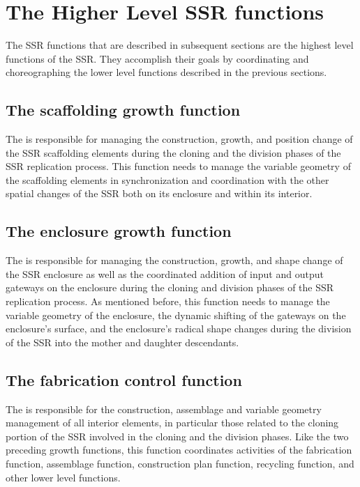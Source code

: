\section{The Higher Level SSR functions}

The SSR functions that are
described in subsequent sections are the highest level functions of the
SSR. They accomplish their goals by coordinating and choreographing the
lower level functions described in the previous sections.

\subsection[The scaffolding growth function]{The scaffolding growth function}

The  
is responsible for managing the construction, growth, and
position change of the SSR scaffolding elements during the cloning and
the division phases of the SSR replication process. This function needs to
manage the variable geometry of the scaffolding elements in
synchronization and coordination with the other spatial changes of the
SSR both on its enclosure and within its interior.

\subsection[The enclosure growth function]{The enclosure growth
function}

The  is responsible for managing
the construction, growth, and shape
change of the SSR enclosure as well as the coordinated addition of
input and output gateways on the enclosure during the cloning and
division phases of the SSR replication process. As mentioned before, this
function needs to manage the variable geometry of the enclosure, the
dynamic shifting of the gateways on the enclosure's surface, and the
enclosure's radical shape changes during the division of the SSR
into the mother and daughter descendants.

\subsection[The fabrication control function]{The fabrication control
function}

The  is responsible for the construction, assemblage and variable
geometry management of all interior elements, in particular those
related to the cloning portion of the SSR involved in the cloning and the
division phases.  Like the two preceding growth
functions, this function coordinates activities of the fabrication
function, assemblage function, construction plan function, recycling
function, and other lower level functions. 

